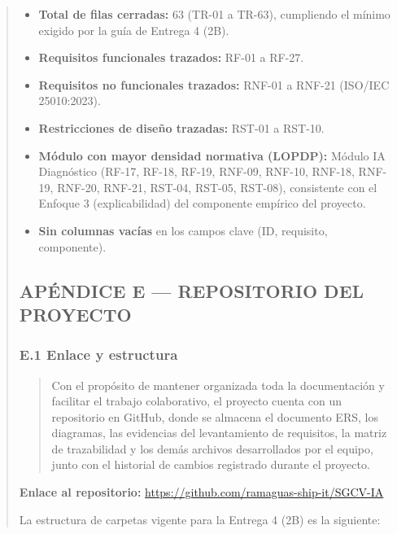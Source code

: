 \documentclass[
]{article}
\begin{document}
\begin{quote}
\begin{itemize}
  \item \textbf{Total de filas cerradas:} 63 (TR-01 a TR-63), cumpliendo el mínimo exigido por la guía de Entrega 4 (2B).
  \item \textbf{Requisitos funcionales trazados:} RF-01 a RF-27.
  \item \textbf{Requisitos no funcionales trazados:} RNF-01 a RNF-21 (ISO/IEC 25010:2023).
  \item \textbf{Restricciones de diseño trazadas:} RST-01 a RST-10.
  \item \textbf{Módulo con mayor densidad normativa (LOPDP):} Módulo IA Diagnóstico (RF-17, RF-18, RF-19, RNF-09, RNF-10, RNF-18, RNF-19, RNF-20, RNF-21, RST-04, RST-05, RST-08), consistente con el Enfoque 3 (explicabilidad) del componente empírico del proyecto.
  \item \textbf{Sin columnas vacías} en los campos clave (ID, requisito, componente).
\end{itemize}


\subsection{APÉNDICE E --- REPOSITORIO DEL PROYECTO}\label{apendice-e-repositorio}

\subsubsection{E.1 Enlace y estructura}\label{e1-enlace-y-estructura}

\begin{quote}
Con el propósito de mantener organizada toda la documentación y
facilitar el trabajo colaborativo, el proyecto cuenta con un
repositorio en GitHub, donde se almacena el documento ERS, los
diagramas, las evidencias del levantamiento de requisitos, la matriz
de trazabilidad y los demás archivos desarrollados por el equipo,
junto con el historial de cambios registrado durante el proyecto.
\end{quote}

\noindent\textbf{Enlace al repositorio:}
\url{https://github.com/ramaguas-ship-it/SGCV-IA}

\vspace{0.2cm}
\noindent{}
\vspace{0.3cm}
\noindent La estructura de carpetas vigente para la Entrega 4 (2B) es la
siguiente:


\end{quote}
\end{document}

